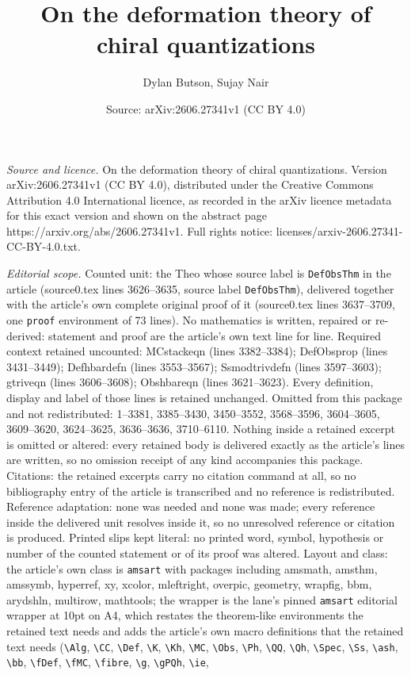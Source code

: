 \documentclass[10pt,a4paper]{amsart}
\title[On the deformation theory of chiral quantizations]{On the deformation theory of chiral quantizations}
\author{Dylan Butson, Sujay Nair}
\date{Source: arXiv:2606.27341v1 (CC BY 4.0)}
\begin{document}
\maketitle

\noindent\emph{Source and licence.} On the deformation theory of chiral quantizations. Version arXiv:2606.27341v1 (CC BY 4.0), distributed under the Creative Commons Attribution 4.0 International licence, as recorded in the arXiv licence metadata for this exact version and shown on the abstract page https://arxiv.org/abs/2606.27341v1. Full rights notice: licenses/arxiv-2606.27341-CC-BY-4.0.txt.\par\smallskip

\noindent\textit{Editorial scope.} Counted unit: the Theo whose source label is \texttt{DefObsThm} in the article (source0.tex lines 3626--3635, source label \texttt{DefObsThm}), delivered together with the article's own complete original proof of it (source0.tex lines 3637--3709, one \texttt{proof} environment of 73 lines). No mathematics is written, repaired or re-derived: statement and proof are the article's own text line for line. Required context retained uncounted: MCstackeqn (lines 3382--3384); DefObsprop (lines 3431--3449); Defhbardefn (lines 3553--3567); Ssmodtrivdefn (lines 3597--3603); gtriveqn (lines 3606--3608); Obshbareqn (lines 3621--3623). Every definition, display and label of those lines is retained unchanged. Omitted from this package and not redistributed: 1--3381, 3385--3430, 3450--3552, 3568--3596, 3604--3605, 3609--3620, 3624--3625, 3636--3636, 3710--6110. Nothing inside a retained excerpt is omitted or altered: every retained body is delivered exactly as the article's lines are written, so no omission receipt of any kind accompanies this package. Citations: the retained excerpts carry no citation command at all, so no bibliography entry of the article is transcribed and no reference is redistributed. Reference adaptation: none was needed and none was made; every reference inside the delivered unit resolves inside it, so no unresolved reference or citation is produced. Printed slips kept literal: no printed word, symbol, hypothesis or number of the counted statement or of its proof was altered. Layout and class: the article's own class is \texttt{amsart} with packages including amsmath, amsthm, amssymb, hyperref, xy, xcolor, mleftright, overpic, geometry, wrapfig, bbm, arydshln, multirow, mathtools; the wrapper is the lane's pinned \texttt{amsart} editorial wrapper at 10pt on A4, which restates the theorem-like environments the retained text needs and adds the article's own macro definitions that the retained text needs (\texttt{\textbackslash Alg}, \texttt{\textbackslash CC}, \texttt{\textbackslash Def}, \texttt{\textbackslash K}, \texttt{\textbackslash Kh}, \texttt{\textbackslash MC}, \texttt{\textbackslash Obs}, \texttt{\textbackslash Ph}, \texttt{\textbackslash QQ}, \texttt{\textbackslash Qh}, \texttt{\textbackslash Spec}, \texttt{\textbackslash Ss}, \texttt{\textbackslash ash}, \texttt{\textbackslash bb}, \texttt{\textbackslash fDef}, \texttt{\textbackslash fMC}, \texttt{\textbackslash fibre}, \texttt{\textbackslash g}, \texttt{\textbackslash gPQh}, \texttt{\textbackslash ie}, 
\end{document}

